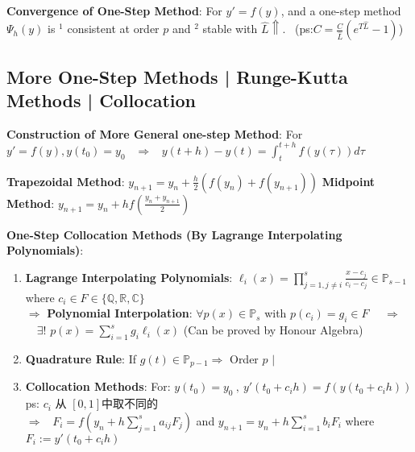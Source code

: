 \documentclass[9pt]{article}
\begin{document}
\vspace{-2pt}
\textbf{Convergence of One-Step Method}: {\small For $y'=f(y)$, and a one-step method $\Psi_h(y)$ is $^1$ consistent at order $p$ and $^2$ stable with $\widehat{L}\Uparrow$.} \ {\tiny (ps:$C=\frac{C}{\widehat{L}}(e^{T\widehat{L}}-1)$)}


\subsection{More One-Step Methods | Runge-Kutta Methods | Collocation} %

\textbf{Construction of More General one-step Method}: For $y'=f(y),y(t_0)=y_0$ \ $\Rightarrow$ \ $y(t+h)-y(t)=\int^{t+h}_tf(y(\tau))d\tau$

\textbf{Trapezoidal Method}: $y_{n+1}=y_n+\frac{h}{2}(f(y_n)+f(y_{n+1}))$ \quad \quad \textbf{Midpoint Method}: {\small $y_{n+1}=y_n+hf(\frac{y_n+y_{n+1}}{2})$}

\textbf{One-Step Collocation Methods (By Lagrange Interpolating Polynomials)}:

\begin{enumerate}[itemsep=-2pt, topsep=-2pt]
    \item \textbf{Lagrange Interpolating Polynomials}: $\ell_{i}(x)=\prod_{j=1,j\ne i}^{s}\frac{x-c_j}{c_i-c_j}\in\mathbb{P}_{s-1}$ \quad where $c_i\in F\in\{\mathbb{Q},\mathbb{R},\mathbb{C}\}$ \\
    $\Rightarrow$ \textbf{Polynomial Interpolation}: $\forall p(x)\in \mathbb{P}_s$ with $p(c_i)=g_i\in F$ \ \ $\Rightarrow$ \ \ $\exists!$ $p(x)=\sum_{i=1}^{s}g_i\ell_i(x)$ {\tiny (Can be proved by Honour Algebra)}
    \item \textbf{Quadrature Rule}: {\scriptsize If $g(t)\in\mathbb{P}_{p-1}\Rightarrow$ Order $p$} \quad $\big|$  
    \item \textbf{Collocation Methods}: For: $y(t_0)=y_0 \ , \ y'(t_0+c_ih)=f(y(t_0+c_ih))$ {\tiny ps: $c_i$ 从 $[0,1]$中取不同的} \\
    $\Rightarrow$ \ $F_i=f(y_n+h\sum_{j=1}^{s}a_{ij}F_j)$ and $y_{n+1}=y_n+h\sum_{i=1}^{s}b_iF_i$ \hspace{30pt} where $F_i:=y'(t_0+c_ih)$
\end{enumerate}
\end{document}
